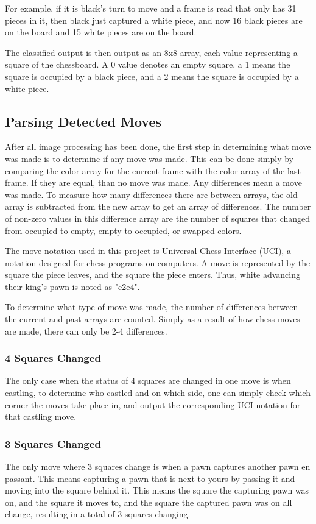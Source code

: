 \documentclass[journal]{IEEEtran}
\begin{document}
For example, if it is black's turn to move and a frame is read that only has 31 pieces in it, then black just captured a white piece, and now 16 black pieces are on the board and 15 white pieces are on the board.

The classified output is then output as an 8x8 array, each value representing a square of the chessboard. A 0 value denotes an empty square, a 1 means the square is occupied by a black piece, and a 2 means the square is occupied by a white piece.

\vspace{12pt}

\subsection{Parsing Detected Moves}
\label{MoveParsing}
After all image processing has been done, the first step in determining what move was made is to determine if any move was made. This can be done simply by comparing the color array for the current frame with the color array of the last frame. If they are equal, than no move was made. Any differences mean a move was made. To measure how many differences there are between arrays, the old array is subtracted from the new array to get an array of differences. The number of non-zero values in this difference array are the number of squares that changed from occupied to empty, empty to occupied, or swapped colors.

The move notation used in this project is Universal Chess Interface (UCI), a notation designed for chess programs on computers. A move is represented by the square the piece leaves, and the square the piece enters. Thus, white advancing their king's pawn is noted as "e2e4".

To determine what type of move was made, the number of differences between the current and past arrays are counted. Simply as a result of how chess moves are made, there can only be 2-4 differences.

\subsubsection{4 Squares Changed}
The only case when the status of 4 squares are changed in one move is when castling, to determine who castled and on which side, one can simply check which corner the moves take place in, and output the corresponding UCI notation for that castling move.

\subsubsection{3 Squares Changed}
The only move where 3 squares change is when a pawn captures another pawn en passant. This means capturing a pawn that is next to yours by passing it and moving into the square behind it. This means the square the capturing pawn was on, and the square it moves to, and the square the captured pawn was on all change, resulting in a total of 3 squares changing.
\end{document}
